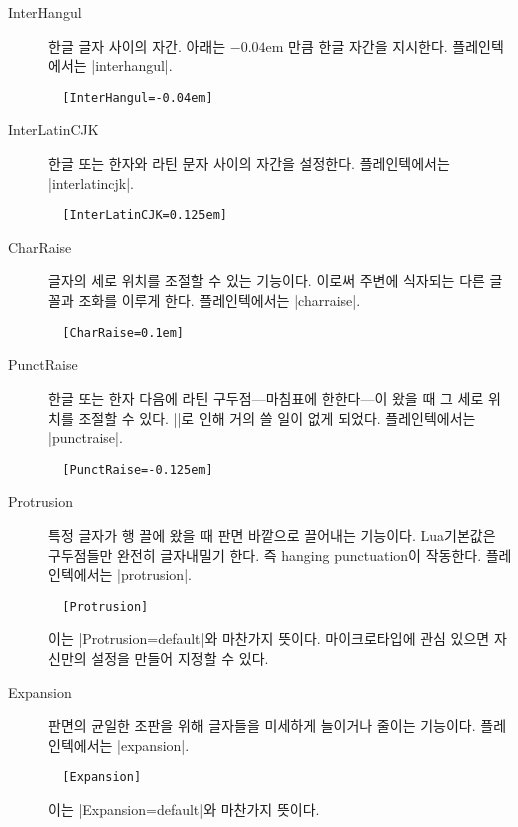 \documentclass[a4paper]{article}
\begin{document}
\begin{description}
\item[InterHangul] 한글 글자 사이의 자간.  아래는 $-0.04$em 만큼 한글
  자간을 지시한다. 플레인텍에서는 |interhangul|.
\begin{verbatim}
  [InterHangul=-0.04em]
\end{verbatim}

\item[InterLatinCJK] 한글 또는 한자와 라틴 문자 사이의 자간을
  설정한다. 플레인텍에서는 |interlatincjk|.
\begin{verbatim}
  [InterLatinCJK=0.125em]
\end{verbatim}

\item[CharRaise] 글자의 세로 위치를
  { 조절}할 수 있는 기능이다.
  이로써 주변에 식자되는 다른 글꼴과 조화를 이루게 한다.
  플레인텍에서는 |charraise|.
\begin{verbatim}
  [CharRaise=0.1em]
\end{verbatim}

\item[PunctRaise] 한글 또는 한자 다음에 라틴 구두점---마침표에
  한한다---이 왔을 때 그 세로 위치를 조절할 수 있다.
  |\hangulpunctuations|로 인해 거의 쓸 일이 없게 되었다.
  플레인텍에서는 |punctraise|.
\begin{verbatim}
  [PunctRaise=-0.125em]
\end{verbatim}

\item[Protrusion] 특정 글자가 행 끌에 왔을 때 판면 바깥으로 끌어내는
  기능이다.  Lua 기본값은 구두점들만 완전히 글자내밀기 한다. 즉
  hanging punctuation이 작동한다.  플레인텍에서는 |protrusion|.
\begin{verbatim}
  [Protrusion]
\end{verbatim}
  이는 |Protrusion=default|와 마찬가지 뜻이다.  마이크로타입에 관심
  있으면 자신만의 설정을 만들어 지정할 수 있다.

\item[Expansion] 판면의 균일한 조판을 위해 글자들을 미세하게 늘이거나
  줄이는 기능이다.  플레인텍에서는 |expansion|.
\begin{verbatim}
  [Expansion]
\end{verbatim}
  이는 |Expansion=default|와 마찬가지 뜻이다.

\end{description}
\end{document}
